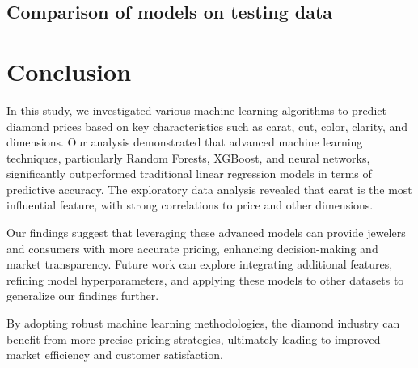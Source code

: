 \documentclass[conference]{IEEEtran}
\begin{document}
\subsection{Comparison of models on testing data}

\section{Conclusion}

In this study, we investigated various machine learning algorithms to predict diamond prices based on key characteristics such as carat, cut, color, clarity, and dimensions. Our analysis demonstrated that advanced machine learning techniques, particularly Random Forests, XGBoost, and neural networks, significantly outperformed traditional linear regression models in terms of predictive accuracy. The exploratory data analysis revealed that carat is the most influential feature, with strong correlations to price and other dimensions. 

Our findings suggest that leveraging these advanced models can provide jewelers and consumers with more accurate pricing, enhancing decision-making and market transparency. Future work can explore integrating additional features, refining model hyperparameters, and applying these models to other datasets to generalize our findings further.

By adopting robust machine learning methodologies, the diamond industry can benefit from more precise pricing strategies, ultimately leading to improved market efficiency and customer satisfaction.
\end{document}
